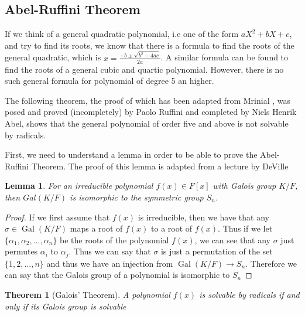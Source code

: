 \documentclass[12pt]{article}
\newtheorem{theorem}{Theorem}
\newtheorem{lemma}{Lemma}
\theoremstyle{definition}
\newcommand{\Gal}{\operatorname{Gal}}
\begin{document}
\subsection{Abel-Ruffini Theorem}

If we think of a general quadratic polynomial, i.e one of the form $aX^2+bX+c$, and try to find its roots, we know that there is a formula to find the roots of the general quadratic, which is $x = \frac{-b \pm \sqrt{b^2 - 4ac}}{2a}$. A similar formula can be found to find the roots of a general cubic and quartic polynomial. However, there is no such general formula for polynomial of degree 5 an higher.

The following theorem, the proof of which has been adapted from Mrinial \cite{Abel-Ruffini}, was posed and proved (incompletely) by Paolo Ruffini and completed by Niels Henrik Abel, shows that the general polynomial of order five and above is not solvable by radicals.

First, we need to understand a lemma in order to be able to prove the Abel-Ruffini Theorem. The proof of this lemma is adapted from a lecture by DeVille \cite{galois-lecture-polynomials}

\begin{lemma}\label{lemma:galois-symmetric}
    For an irreducible polynomial $f(x) \in F[x]$ with Galois group $K/F$, then $Gal(K/F)$ is isomorphic to the symmetric group $S_n$.
\end{lemma}

\begin{proof}
    If we first assume that $f(x)$ is irreducible, then we have that any $\sigma \in \Gal(K/F)$ maps a root of $f(x)$ to a root of $f(x)$. Thus if we let $\{\alpha_1,\alpha_2,...,\alpha_n\}$ be the roots of the polynomial $f(x)$, we can see that any $\sigma$ just permutes $\alpha_i$ to $\alpha_j$. Thus we can say that $\sigma$ is just a permutation of the set $\{1,2,...,n\}$ and thus we have an injection from $\Gal(K/F) \to S_n$. Therefore we can say that the Galois group of a polynomial is isomorphic to $S_n$
\end{proof}

\begin{theorem}[Galois' Theorem]\label{thm:galois-theorem}
     A polynomial $f(x)$ is solvable by radicals if and only if its Galois group is solvable
\end{theorem}
\end{document}
